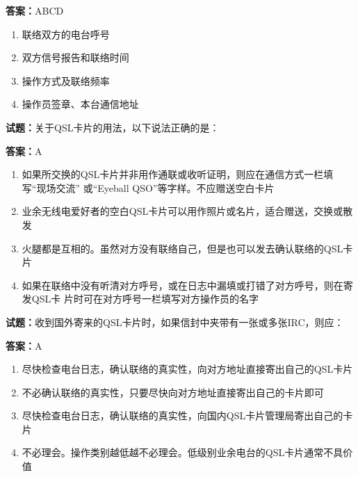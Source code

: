 \documentclass{ctexbook}
\begin{document}
\textbf{答案：}ABCD 

\begin{enumerate}[leftmargin=3em]
  \item 联络双方的电台呼号 

  \item 双方信号报告和联络时间 

  \item 操作方式及联络频率 

  \item 操作员签章、本台通信地址 

\end{enumerate}





\vspace{1em}

\textbf{试题：}关于QSL卡片的用法，以下说法正确的是： 

\textbf{答案：}A 

\begin{enumerate}[leftmargin=3em]
  \item 如果所交换的QSL卡片并非用作通联或收听证明，则应在通信方式一栏填写“现场交流”
或“Eyeball QSO”等字样。不应赠送空白卡片 

  \item 业余无线电爱好者的空白QSL卡片可以用作照片或名片，适合赠送，交换或散发 

  \item 火腿都是互相的。虽然对方没有联络自己，但是也可以发去确认联络的QSL卡片 

  \item 如果在联络中没有听清对方呼号，或在日志中漏填或打错了对方呼号，则在寄发QSL卡
片时可在对方呼号一栏填写对方操作员的名字 


\end{enumerate}





\vspace{1em}

\textbf{试题：}收到国外寄来的QSL卡片时，如果信封中夹带有一张或多张IRC，则应： 

\textbf{答案：}A 

\begin{enumerate}[leftmargin=3em]
  \item 尽快检查电台日志，确认联络的真实性，向对方地址直接寄出自己的QSL卡片 

  \item 不必确认联络的真实性，只要尽快向对方地址直接寄出自己的卡片即可 

  \item 尽快检查电台日志，确认联络的真实性，向国内QSL卡片管理局寄出自己的卡片 

  \item 不必理会。操作类别越低越不必理会。低级别业余电台的QSL卡片通常不具价值 

\end{enumerate}
\end{document}

